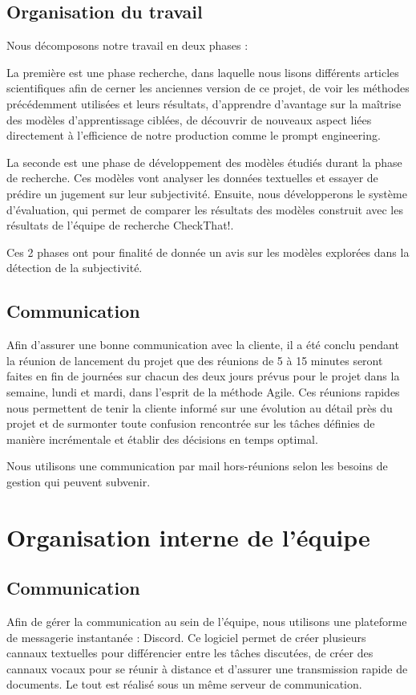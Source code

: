 \documentclass[11pt]{rapport_class}
\begin{document}
\subsection{Organisation du travail}
Nous décomposons notre travail en deux phases : 

La première est une phase recherche, dans laquelle nous lisons différents articles scientifiques afin de cerner les anciennes version de ce projet, de voir les méthodes précédemment utilisées et leurs résultats, d'apprendre d'avantage sur la maîtrise des modèles d'apprentissage ciblées, de découvrir de nouveaux aspect liées directement à l'efficience de notre production comme le prompt engineering. 

La seconde est une phase de développement des modèles étudiés durant la phase de recherche. Ces modèles vont analyser les données textuelles et essayer de prédire un jugement sur leur subjectivité. Ensuite, nous développerons le système d’évaluation, qui permet de comparer les résultats des modèles construit avec les résultats de l’équipe de recherche CheckThat!. 

Ces 2 phases ont pour finalité de donnée un avis sur les modèles explorées dans la détection de la subjectivité.

\subsection{Communication}
Afin d'assurer une bonne communication avec la cliente, il a été conclu pendant la réunion de lancement du projet que des réunions de 5 à 15 minutes seront faites en fin de journées sur chacun des deux jours prévus pour le projet dans la semaine, lundi et mardi, dans l'esprit de la méthode Agile. Ces réunions rapides nous permettent de tenir la cliente informé sur une évolution au détail près du projet et de surmonter toute confusion rencontrée sur les tâches définies de manière incrémentale et établir des décisions en temps optimal.

Nous utilisons une communication par mail hors-réunions selon les besoins de gestion qui peuvent subvenir.


\section{Organisation interne de l'équipe}
\subsection{Communication}
Afin de gérer la communication au sein de l'équipe, nous utilisons une plateforme de messagerie instantanée : Discord. Ce logiciel permet de créer plusieurs cannaux textuelles pour différencier entre les tâches discutées, de créer des cannaux vocaux pour se réunir à distance et d'assurer une transmission rapide de documents. Le tout est réalisé sous un même serveur de communication.
\end{document}
